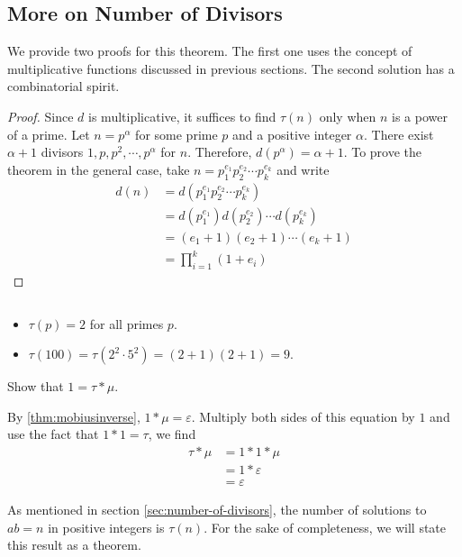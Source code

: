 \subsection{More on Number of Divisors}\label{sec:d(n)}

We provide two proofs for this theorem. The first one uses the concept of multiplicative functions discussed in previous sections. The second solution has a combinatorial spirit.

\begin{proof}
	Since $d$ is multiplicative, it suffices to find $\tau(n)$ only when $n$ is a power of a prime. Let $n=p^\alpha$ for some prime $p$ and a positive integer $\alpha$. There exist $\alpha+1$ divisors $1, p, p^2, \cdots, p^\alpha$ for $n$. Therefore, $d(p^\alpha)=\alpha + 1$. To prove the theorem in the general case, take $n=p_1^{e_1}p_2^{e_2}\cdots p_k^{e_k}$ and write
		\begin{align*}
			d(n) & = d(p_1^{e_1}p_2^{e_2}\cdots p_k^{e_k})\\
			 & = d(p_1^{e_1}) d(p_2^{e_2})\cdots d(p_k^{e_k})\\
			 & = (e_1+1)(e_2+1)\cdots (e_k+1)\\
			 & = \prod_{i=1}^{k} (1+e_i)
		\end{align*}
\end{proof}

\begin{example}
	$ $
	\begin{itemize}
		\item $\tau(p)=2$ for all primes $p$.
		\item $\tau(100) = \tau(2^2 \cdot 5^2) = (2+1)(2+1)=9$.
	\end{itemize}
\end{example}

\begin{problem}
	Show that $1 = \tau \ast \mu$.
\end{problem}

\begin{solution}
	By \autoref{thm:mobiusinverse}, $1 \ast \mu =\varepsilon$. Multiply both sides of this equation by $1$ and use the fact that $1\ast 1 = \tau$, we find
		\begin{align*}
			\tau \ast \mu &= 1 \ast 1 \ast \mu \\
				  &= 1 \ast \varepsilon\\
				  &= \varepsilon
		\end{align*}
\end{solution}
As mentioned in section \ref{sec:number-of-divisors}, the number of solutions to $ab = n$ in positive integers is $\tau(n)$. For the sake of completeness, we will state this result as a theorem.


